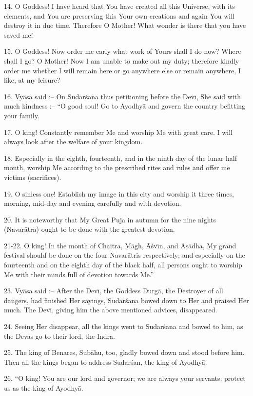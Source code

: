 14. O Goddess! I have heard that You have created all this Universe, with its elements, and You are preserving this Your own creations and again You will destroy it in due time. Therefore O Mother! What wonder is there that you have saved me!

15. O Goddess! Now order me early what work of Yours shall I do now? Where shall I go? O Mother! Now I am unable to make out my duty; therefore kindly order me whether I will remain here or go anywhere else or remain anywhere, I like, at my leisure?

16. Vy\=asa said :-- On Sudar\'sana thus petitioning before the Dev\={\i}, She said with much kindness :-- ``O good soul! Go to Ayodhy\=a and govern the country befitting your family.

17. O king! Constantly remember Me and worship Me with great care. I will always look after the welfare of your kingdom.

18. Especially in the eighth, fourteenth, and in the ninth day of the lunar half month, worship Me according to the prescribed rites and rules and offer me victims (sacrifices).

19. O sinless one! Establish my image in this city and worship it three times, morning, mid-day and evening carefully and with devotion.

20. It is noteworthy that My Great Puja in autumn for the nine nights (Navar\=atra) ought to be done with the greatest devotion.

21-22. O king! In the month of Chaitra, M\=agh, \=A\'sv\={\i}n, and \=A\d{s}\=adha, My grand festival should be done on the four Navar\=atris respectively; and especially on the fourteenth and on the eighth day of the black half, all persons ought to worship Me with their minds full of devotion towards Me.''

23. Vy\=asa said :-- After the Dev\={\i}, the Goddess Durg\=a, the Destroyer of all dangers, had finished Her sayings, Sudar\'sana bowed down to Her and praised Her much. The Dev\={\i}, giving him the above mentioned advices, disappeared.

24. Seeing Her disappear, all the kings went to Sudar\'sana and bowed to him, as the Devas go to their lord, the Indra.

25. The king of Benares, Sub\=ahu, too, gladly bowed down and stood before him. Then all the kings began to address Sudar\'san, the king of Ayodhy\=a.

26. ``O king! You are our lord and governor; we are always your servants; protect us as the king of Ayodhy\=a.

